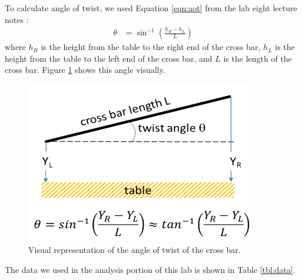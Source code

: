 \documentclass[12 pt]{report}
\begin{document}
To calculate angle of twist, we used Equation \ref{eqn:aot} from the lab eight lecture notes \cite{lecture_notes}:
\begin{align} \label{eqn:aot}
	\theta&=\sin^{-1}\left(\frac{h_R-h_L}{L}\right)
\end{align}
where $h_R$ is the height from the table to the right end of the cross bar, $h_L$ is the height from the table to the left end of the cross bar, and $L$ is the length of the cross bar. Figure \ref{fig:aot} shows this angle visually.

\begin{figure}[htbp]
	\centering
	\includegraphics[width=4in]{images/aot}
	\caption{Visual representation of the angle of twist of the cross bar. \cite{lecture_notes}}
	\label{fig:aot}
\end{figure}

The data we used in the analysis portion of this lab is shown in Table \ref{tbl:data}.
\end{document}
